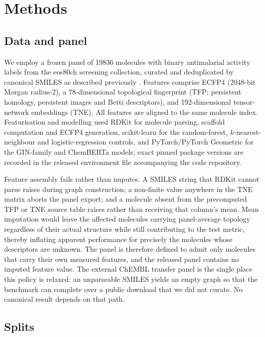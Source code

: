 \documentclass[11pt,a4paper]{article}
\begin{document}
\section{Methods}

\subsection{Data and panel}

We employ a frozen panel of \num{19836} molecules with binary antimalarial activity labels from the eos80ch screening collection, curated and deduplicated by canonical SMILES as described previously \citep{temgoua2026antimalarial}. Features comprise ECFP4 (\num{2048}-bit Morgan radius-\num{2}), a \num{78}-dimensional topological fingerprint (TFP; persistent homology, persistent images and Betti descriptors), and \num{192}-dimensional tensor-network embeddings (TNE). All features are aligned to the same molecule index. Featurisation and modelling used RDKit \citep{RDKit} for molecule parsing, scaffold computation and ECFP4 generation, scikit-learn for the random-forest, $k$-nearest-neighbour and logistic-regression controls, and PyTorch/PyTorch Geometric for the GIN-family and ChemBERTa models; exact pinned package versions are recorded in the released environment file accompanying the code repository.

Feature assembly fails rather than imputes. A SMILES string that RDKit cannot parse raises during graph construction; a non-finite value anywhere in the TNE matrix aborts the panel export; and a molecule absent from the precomputed TFP or TNE source table raises rather than receiving that column's mean. Mean imputation would leave the affected molecules carrying panel-average topology regardless of their actual structure while still contributing to the test metric, thereby inflating apparent performance for precisely the molecules whose descriptors are unknown. The panel is therefore defined to admit only molecules that carry their own measured features, and the released panel contains no imputed feature value. The external ChEMBL transfer panel is the single place this policy is relaxed: an unparseable SMILES yields an empty graph so that the benchmark can complete over a public download that we did not curate. No canonical result depends on that path.

\subsection{Splits}
\end{document}
